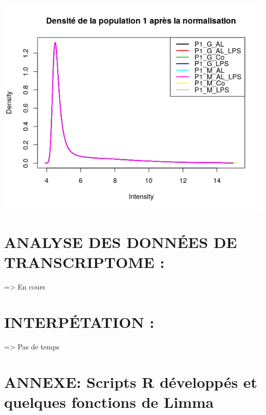 \documentclass[a4paper,10pt]{article}
\begin{document}
\begin{center}
 \includegraphics[scale=0.5]{../../R/output/Densitypop1C.png}
\end{center}

\section{ANALYSE DES DONN\'{E}ES DE TRANSCRIPTOME :}
=> En cours
\section{INTERP\'{E}TATION :}
=> Pas de temps
\section{ANNEXE: Scripts R développés et quelques fonctions de Limma}
\end{document}
